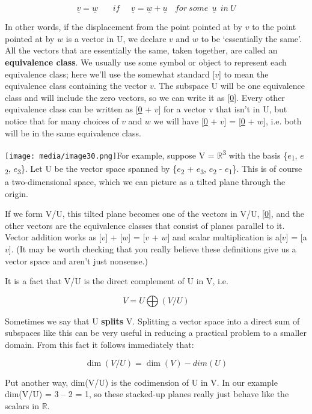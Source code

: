 \documentclass[oneside,english]{amsbook}
\numberwithin{section}{chapter}
\theoremstyle{plain}
\theoremstyle{definition}
\begin{document}
\[\underline{v} = \underline{w}\ \ \ \ \ \ \ \ if\ \ \ \ \ \ \underline{v} = \underline{w} + \underline{u}\ \ \ \ for\ some\ \ \underline{u}\ \ in\ U\]

In other words, if the displacement from the point pointed at by $v$
to the point pointed at by $w$ is a vector in U, we declare $v$
and $w$ to be `essentially the same'. All the vectors that are
essentially the same, taken together, are called an \textbf{equivalence
	class}. We usually use some symbol or object to represent each
equivalence class; here we'll use the somewhat standard {[}$v${]} to
mean the equivalence class containing the vector $v$. The subspace U
will be one equivalence class and will include the zero vectors, so we
can write it as {[}\ul{0}{]}. Every other equivalence class can be
written as {[}\ul{0} + $v${]} for a vector v that isn't in U, but
notice that for many choices of $v$ and $w$ we will have {[}\ul{0}
+ $v${]} = {[}\ul{0} + $w${]}, i.e. both will be in the same
equivalence class.

\texttt{[image: media/image30.png]}For
example, suppose V = $\mathbb{R}$\textsuperscript{3} with the basis
\{$e$\textsubscript{1}, $e$\textsubscript{2},
$e$\textsubscript{3}\}. Let U be the vector space spanned by
\{$e$\textsubscript{2} + $e$\textsubscript{3},
$e$\textsubscript{2} - $e$\textsubscript{1}\}. This is of course a
two-dimensional space, which we can picture as a tilted plane through
the origin.

If we form V/U, this tilted plane becomes one of the vectors in V/U,
{[}\ul{0}{]}, and the other vectors are the equivalence classes that
consist of planes parallel to it. Vector addition works as {[}$v${]}
+ {[}$w${]} = {[}$v$ + $w${]} and scalar multiplication is
a{[}$v${]} = {[}a$v${]}. (It may be worth checking that you really
believe these definitions give us a vector space and aren't just
nonsense.)

It is a fact that V/U is the direct complement of U in V, i.e.

\[V = U\bigoplus(V/U)\]

Sometimes we say that U \textbf{splits} V. Splitting a vector space into
a direct sum of subspaces like this can be very useful in reducing a
practical problem to a smaller domain. From this fact it follows
immediately that:

\[\dim(V/U) = \dim(V) - dim(U)\]

Put another way, dim(V/U) is the codimension of U in V. In our example
dim(V/U) = 3 -- 2 = 1, so these stacked-up planes really just behave
like the scalars in $\mathbb{R}$.
\end{document}
